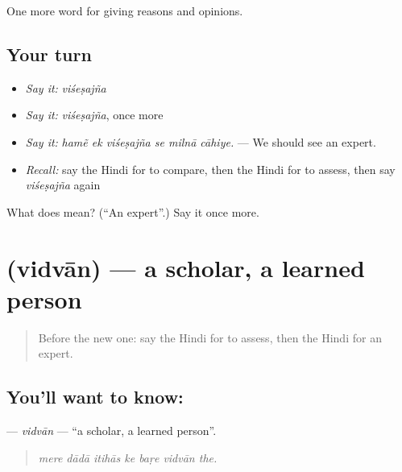 \begin{grammarlens}[title={What you've built}]
One more word for giving reasons and opinions.
\end{grammarlens}

\subsection*{Your turn}
\begin{itemize}
\raggedright
  \item \emph{Say it:} \emph{viśeṣajña}
  \item \emph{Say it:} \emph{viśeṣajña}, once more
  \item \emph{Say it:} \emph{hamẽ ek viśeṣajña se milnā cāhiye.} — We should see an expert.
  \item \emph{Recall:} say the Hindi for to compare, then the Hindi for to assess, then say \emph{viśeṣajña} again
\end{itemize}

\begin{tcolorbox}[breakable,colback=teal!4,colframe=teal!35!black,title={Before you move on}]
What does  mean? (\textquotedblleft{}An expert\textquotedblright{}.) Say it once more.
\end{tcolorbox}
\section[\texorpdfstring{\hi{विद्वान} (vidvān)}{विद्वान (vidvān)}]{ (vidvān) — a scholar, a learned person}

\label{lesson:HI-C364-vidvan}



\begin{quote}
Before the new one: say the Hindi for to assess, then the Hindi for an expert.
\end{quote}

\subsection*{You'll want to know: }
\textbf{} — \emph{vidvān} — \textquotedblleft{}a scholar, a learned person\textquotedblright{}.

\begin{quote}
      
\end{quote}

\begin{quote}
\emph{mere dādā itihās ke baṛe vidvān the.}
\end{quote}

